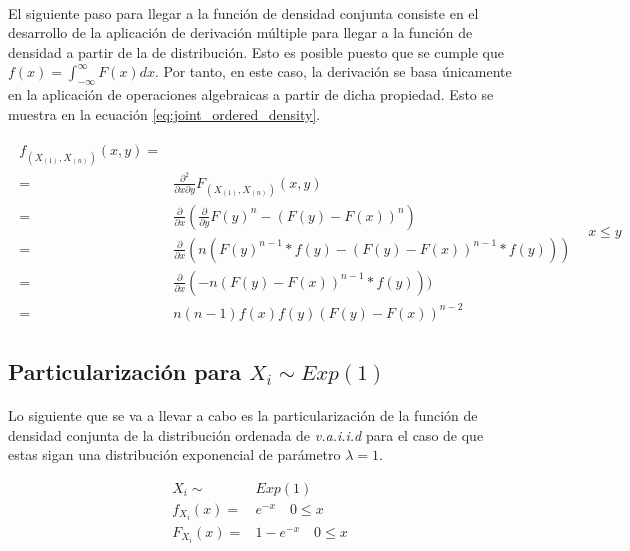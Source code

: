 \documentclass{article}
\begin{document}
    \paragraph{}
    El siguiente paso para llegar a la función de densidad conjunta consiste en el desarrollo de la aplicación de derivación múltiple para llegar a la función de densidad a partir de la de distribución. Esto es posible puesto que se cumple que $f(x)= \int_{-\infty}^{\infty} F(x) dx$. Por tanto, en este caso, la derivación se basa únicamente en la aplicación de operaciones algebraicas a partir de dicha propiedad. Esto se muestra en la ecuación \ref{eq:joint_ordered_density}.

    \begin{align}
      \label{eq:joint_ordered_density}
      \begin{split}
        f_{(X_{(1)}, X_{(n)})} (x,y) =& \\
        =& \frac{\partial^2}{\partial x \partial y}F_{(X_{(1)}, X_{(n)})} (x,y) \\
        =& \frac{\partial}{\partial x}( \frac{\partial}{\partial y} F(y)^n - (F(y)-F(x))^n) \\
        =& \frac{\partial}{\partial x}( n (F(y)^{n-1}*f(y) - (F(y)-F(x))^{n-1}*f(y))) \\
        =& \frac{\partial}{\partial x}( -n (F(y)-F(x))^{n-1}*f(y))) \\
        =& n(n-1)f(x)f(y)(F(y) - F(x))^{n-2}
      \end{split} & x \leq y
    \end{align}

    \subsection{Particularización para $X_i \sim Exp(1)$}

      \paragraph{}
      Lo siguiente que se va a llevar a cabo es la particularización de la función de densidad conjunta de la distribución ordenada de \emph{v.a.i.i.d} para el caso de que estas sigan una distribución exponencial de parámetro $\lambda = 1$.

      \begin{align*}
        X_i \sim& Exp(1)\\
        f_{X_{i}}(x) =& e^{-x}  \quad 0 \leq x \\
        F_{X_{i}}(x) =& 1-e^{-x}  \quad 0 \leq x \\
      \end{align*}
\end{document}
